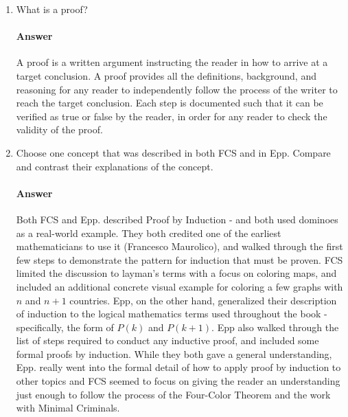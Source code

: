 \documentclass{article}
\begin{document}
\begin{enumerate}

    \item What is a proof?

        \paragraph{Answer}

        A proof is a written argument instructing the reader in how to arrive at a target conclusion. A proof provides all the definitions, background, and reasoning for any reader to independently follow the process of the writer to reach the target conclusion. Each step is documented such that it can be verified as true or false by the reader, in order for any reader to check the validity of the proof.


    \item Choose one concept that was described in both FCS and in Epp.
        Compare and contrast their explanations of the concept.

        \paragraph{Answer}

        Both FCS and Epp. described Proof by Induction - and both used dominoes as a real-world example. They both credited one of the earliest mathematicians to use it (Francesco Maurolico), and walked through the first few steps to demonstrate the pattern for induction that must be proven. FCS limited the discussion to layman's terms with a focus on coloring maps, and included an additional concrete visual example for coloring a few graphs with $n$ and $n+1$ countries. Epp, on the other hand, generalized their description of induction to the logical mathematics terms used throughout the book - specifically, the form of $P(k)$ and $P(k+1)$. Epp also walked through the list of steps required to conduct any inductive proof, and included some formal proofs by induction. While they both gave a general understanding, Epp. really went into the formal detail of how to apply proof by induction to other topics and FCS seemed to focus on giving the reader an understanding just enough to follow the process of the Four-Color Theorem and the work with Minimal Criminals.

\end{enumerate}

\collab{}
\end{document}
